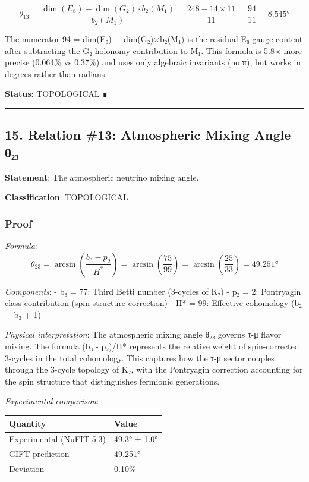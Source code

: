 \documentclass[11pt,a4paper]{article}
\begin{document}
\[\theta_{13} = \frac{\dim(E_8) - \dim(G_2) \cdot b_2(M_1)}{b_2(M_1)} = \frac{248 - 14 \times 11}{11} = \frac{94}{11} = 8.545°\]

The numerator 94 = dim(E₈) − dim(G₂)×b₂(M₁) is the residual E₈ gauge content after subtracting the G₂ holonomy contribution to M₁. This formula is 5.8× more precise (0.064\% vs 0.37\%) and uses only algebraic invariants (no π), but works in degrees rather than radians.

\textbf{Status}: TOPOLOGICAL ∎

\begin{center}\rule{0.5\linewidth}{0.5pt}\end{center}

\subsection{15. Relation \#13: Atmospheric Mixing Angle θ₂₃}\label{relation-13-atmospheric-mixing-angle-ux3b8ux2082ux2083}

\textbf{Statement}: The atmospheric neutrino mixing angle.

\textbf{Classification}: TOPOLOGICAL

\subsubsection{Proof}\label{proof-17}

\emph{Formula}:
\[\theta_{23} = \arcsin\left(\frac{b_3 - p_2}{H^*}\right) = \arcsin\left(\frac{75}{99}\right) = \arcsin\left(\frac{25}{33}\right) = 49.251°\]

\emph{Components}:
- b₃ = 77: Third Betti number (3-cycles of K₇)
- p₂ = 2: Pontryagin class contribution (spin structure correction)
- H* = 99: Effective cohomology (b₂ + b₃ + 1)

\emph{Physical interpretation}:
The atmospheric mixing angle θ₂₃ governs τ-μ flavor mixing. The formula (b₃ - p₂)/H* represents the relative weight of spin-corrected 3-cycles in the total cohomology. This captures how the τ-μ sector couples through the 3-cycle topology of K₇, with the Pontryagin correction accounting for the spin structure that distinguishes fermionic generations.

\emph{Experimental comparison}:

{\def\LTcaptype{none} %
\begin{longtable}[]{@{}ll@{}}
\toprule\noalign{}
Quantity & Value \\
\midrule\noalign{}
\endhead
\bottomrule\noalign{}
\endlastfoot
Experimental (NuFIT 5.3) & 49.3° ± 1.0° \\
GIFT prediction & 49.251° \\
Deviation & 0.10\% \\
\end{longtable}
}
\end{document}
